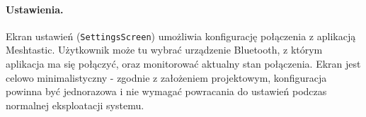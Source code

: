 \paragraph{Ustawienia.}

Ekran ustawień (\texttt{SettingsScreen}) umożliwia konfigurację połączenia z aplikacją
Meshtastic. Użytkownik może tu wybrać urządzenie Bluetooth, z którym aplikacja ma się
połączyć, oraz monitorować aktualny stan połączenia. Ekran jest celowo minimalistyczny -
zgodnie z założeniem projektowym, konfiguracja powinna być jednorazowa i nie wymagać
powracania do ustawień podczas normalnej eksploatacji systemu.
